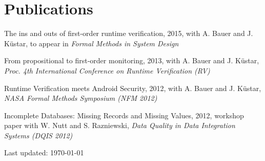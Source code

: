 \documentclass[letterpaper]{article}
\def\footerlink{}%
\newenvironment{no-indent-itemize}{
  \begin{list}{}{
    \setlength{\leftmargin}{0em}
  }
}{
  \end{list}
}
\begin{document}
\section*{Publications}
\begin{no-indent-itemize}
  \item The ins and outs of first-order runtime verification, 2015, with A. Bauer and J. K\"{u}star, 
        to appear in {\it Formal Methods in System Design}
  \item From propositional to first-order monitoring, 2013, with A. Bauer and J. K\"{u}star, 
        {\it Proc. 4th International Conference on Runtime Verification (RV)}
  \item Runtime Verification meets Android Security, 2012, with A. Bauer and J. K\"{u}star, 
        {\it NASA Formal Methods Symposium (NFM 2012)}
  \item Incomplete Databases: Missing Records and Missing Values, 2012, workshop paper with 
        W. Nutt and S. Razniewski, {\it Data Quality in Data Integration Systems (DQIS 2012)}
\end{no-indent-itemize}

\bigskip
\begin{center}
  \begin{footnotesize}
    Last updated: \today \\
    \href{\footerlink}{\texttt{\footerlink}}
  \end{footnotesize}
\end{center}
\end{document}
